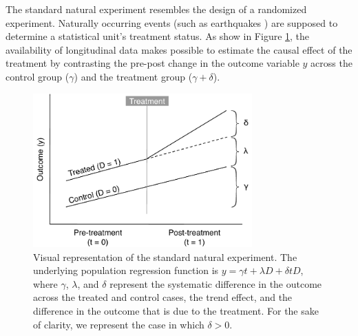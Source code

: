 
The standard natural experiment resembles the
design of a randomized experiment. Naturally occurring events (such
as earthquakes \parencite[e.g.,][]{Belloc2016}) are supposed 
to determine a statistical unit's treatment status. As show in
Figure \ref{fig:ne_logic_viz}, the availability of longitudinal data
makes possible to estimate the causal effect of the treatment by
contrasting the pre-post change in the outcome variable $y$ across
the control group ($\gamma$) and the treatment group 
($ \gamma + \delta$).

\begin{figure}[]
    \centering
    \includegraphics[width=0.75\textwidth]{exhibits/ne_logic_viz.pdf}
    \caption{Visual representation of the standard natural experiment. 
        The underlying population regression function is $y = \gamma t +
        \lambda D + \delta t D$, where $\gamma$, $\lambda$, and $\delta$ represent 
        the systematic difference in the outcome across the treated and control 
        cases, the trend effect, and the difference in the outcome that is due to
        the treatment. For the sake of clarity, we represent the case in which
        $\delta > 0$.}
    \label{fig:ne_logic_viz}
\end{figure}
